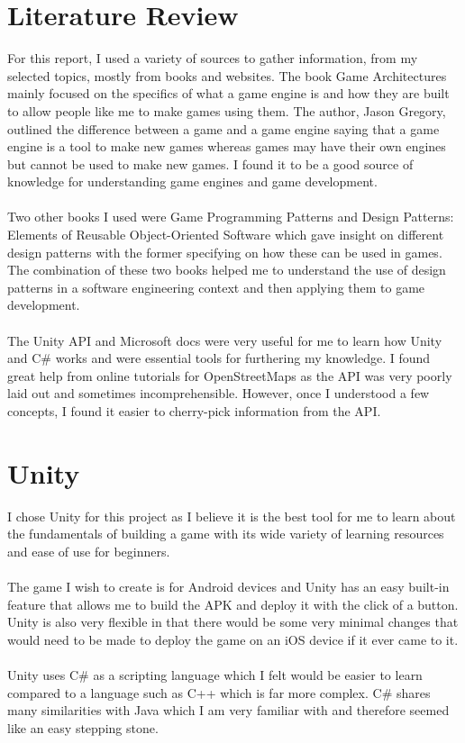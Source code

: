 \documentclass[a4paper]{report}
\begin{document}
\section{Literature Review}
For this report, I used a variety of sources to gather information, from my selected topics, mostly from books and websites. The book Game Architectures mainly focused on the specifics of what a game engine is and how they are built to allow people like me to make games using them. The author, Jason Gregory, outlined the difference between a game and a game engine saying that a game engine is a tool to make new games whereas games may have their own engines but cannot be used to make new games. I found it to be a good source of knowledge for understanding game engines and game development.  
\\\\
Two other books I used were Game Programming Patterns and Design Patterns: Elements of Reusable Object-Oriented Software which gave insight on different design patterns with the former specifying on how these can be used in games. The combination of these two books helped me to understand the use of design patterns in a software engineering context and then applying them to game development.
\\\\
The Unity API and Microsoft docs were very useful for me to learn how Unity and C\# works and were essential tools for furthering my knowledge. I found great help from online tutorials for OpenStreetMaps as the API was very poorly laid out and sometimes incomprehensible. However, once I understood a few concepts, I found it easier to cherry-pick information from the API.

\section{Unity}
I chose Unity for this project as I believe it is the best tool for me to learn about the fundamentals of building a game with its wide variety of learning resources and ease of use for beginners. 
\\\\ 
The game I wish to create is for Android devices and Unity has an easy built-in feature that allows me to build the APK and deploy it with the click of a button. Unity is also very flexible in that there would be some very minimal changes that would need to be made to deploy the game on an iOS device if it ever came to it.
\\\\
Unity uses C\# as a scripting language which I felt would be easier to learn compared to a language such as C++ which is far more complex. C\# shares many similarities with Java which I am very familiar with and therefore seemed like an easy stepping stone.
\end{document}
